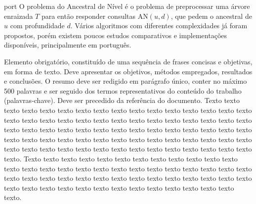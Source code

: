 
\begin{resumo}{port}
O problema do Ancestral de Nível é o problema de preprocessar uma árvore enraizada
$T$ para então responder consultas AN$(u,d)$, que pedem o ancestral de $u$ com
profundidade $d$. Vários algoritmos com diferentes complexidades já foram propostos,
porém existem poucos estudos comparativos e implementações disponíveis, principalmente
em português.


Elemento obrigatório, constituído de uma sequência de frases concisas e
objetivas, em forma de texto.  Deve apresentar os objetivos, métodos empregados,
resultados e conclusões.  O resumo deve ser redigido em parágrafo único, conter
no máximo 500 palavras e ser seguido dos termos representativos do conteúdo do
trabalho (palavras-chave). Deve ser precedido da referência do documento.
Texto texto texto texto texto texto texto texto texto texto texto texto texto
texto texto texto texto texto texto texto texto texto texto texto texto texto
texto texto texto texto texto texto texto texto texto texto texto texto texto
texto texto texto texto texto texto texto texto texto texto texto texto texto
texto texto texto texto texto texto texto texto texto texto texto texto texto
texto texto texto texto texto texto texto texto.
Texto texto texto texto texto texto texto texto texto texto texto texto texto
texto texto texto texto texto texto texto texto texto texto texto texto texto
texto texto texto texto texto texto texto texto texto texto texto texto texto
texto texto texto texto texto texto texto texto texto texto texto texto texto
texto texto.
\end{resumo}

